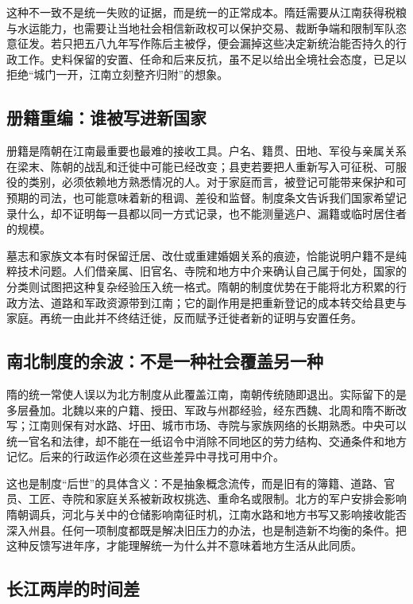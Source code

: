 这种不一致不是统一失败的证据，而是统一的正常成本。隋廷需要从江南获得税粮与水运能力，也需要让当地社会相信新政权可以保护交易、裁断争端和限制军队恣意征发。若只把五八九年写作陈后主被俘，便会漏掉这些决定新统治能否持久的行政工作。史料保留的安置、任命和后来反抗，虽不足以给出全境社会态度，已足以拒绝“城门一开，江南立刻整齐归附”的想象。

\subsection{册籍重编：谁被写进新国家}

册籍是隋朝在江南最重要也最难的接收工具。户名、籍贯、田地、军役与亲属关系在梁末、陈朝的战乱和迁徙中可能已经改变；县吏若要把人重新写入可征税、可服役的类别，必须依赖地方熟悉情况的人。对于家庭而言，被登记可能带来保护和可预期的司法，也可能意味着新的租调、差役和监督。制度条文告诉我们国家希望记录什么，却不证明每一县都以同一方式记录，也不能测量逃户、漏籍或临时居住者的规模。

墓志和家族文本有时保留迁居、改仕或重建婚姻关系的痕迹，恰能说明户籍不是纯粹技术问题。人们借亲属、旧官名、寺院和地方中介来确认自己属于何处，国家的分类则试图把这种复杂经验压入统一格式。隋朝的制度优势在于能将北方积累的行政方法、道路和军政资源带到江南；它的副作用是把重新登记的成本转交给县吏与家庭。再统一由此并不终结迁徙，反而赋予迁徙者新的证明与安置任务。

\subsection{南北制度的余波：不是一种社会覆盖另一种}

隋的统一常使人误以为北方制度从此覆盖江南，南朝传统随即退出。实际留下的是多层叠加。北魏以来的户籍、授田、军政与州郡经验，经东西魏、北周和隋不断改写；江南则保有对水路、圩田、城市市场、寺院与家族网络的长期熟悉。中央可以统一官名和法律，却不能在一纸诏令中消除不同地区的劳力结构、交通条件和地方记忆。后来的行政运作必须在这些差异中寻找可用中介。

这也是制度“后世”的具体含义：不是抽象概念流传，而是旧有的簿籍、道路、官员、工匠、寺院和家庭关系被新政权挑选、重命名或限制。北方的军户安排会影响隋朝调兵，河北与关中的仓储影响南征时机，江南水路和地方书写又影响接收能否深入州县。任何一项制度都既是解决旧压力的办法，也是制造新不均衡的条件。把这种反馈写进年序，才能理解统一为什么并不意味着地方生活从此同质。

\subsection{长江两岸的时间差}

